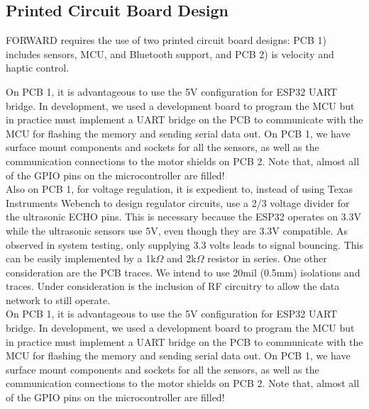 \subsection{Printed Circuit Board Design} \label{sec:pcb-design}
\noindent FORWARD requires the use of two printed circuit board designs: PCB 1) includes sensors, MCU, and Bluetooth support, and PCB 2)  is velocity and haptic control.

\noindent On PCB 1, it is advantageous to use the 5V configuration for ESP32 UART bridge. In development, we used a development board to program the MCU but in practice must implement a UART bridge on the PCB to communicate with the MCU for flashing the memory and sending serial data out. On PCB 1, we have surface mount components and sockets for all the sensors, as well as the communication connections to the motor shields on PCB 2.  Note that, almost all of the GPIO pins on the microcontroller are filled!\\

\noindent Also on PCB 1, for voltage regulation, it is expedient to, instead of using Texas Instruments Webench to design regulator circuits, use a 2/3 voltage divider for the ultrasonic ECHO pins. This is necessary because the ESP32 operates on 3.3V while the ultrasonic sensors use 5V, even though they are 3.3V compatible. As observed in system testing, only supplying 3.3 volts leads to signal bouncing. This can be easily implemented by a 1k$\Omega$ and 2k$\Omega$ resistor in series. One other consideration are the PCB traces. We intend to use 20mil (0.5mm) isolations and traces. Under consideration is the inclusion of RF circuitry to allow the data network to still operate.\\

\noindent On PCB 1, it is advantageous to use the 5V configuration for ESP32 UART bridge. In development, we used a development board to program the MCU but in practice must implement a UART bridge on the PCB to communicate with the MCU for flashing the memory and sending serial data out. On PCB 1, we have surface mount components and sockets for all the sensors, as well as the communication connections to the motor shields on PCB 2.  Note that, almost all of the GPIO pins on the microcontroller are filled!\\

